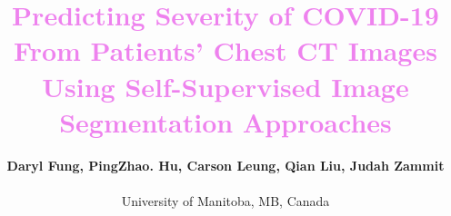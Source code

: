 \documentclass[journal]{IEEEtran}
\title{\textcolor{violet}{Predicting Severity of COVID-19 From Patients' Chest CT Images Using Self-Supervised Image Segmentation Approaches}}
\begin{document}

%
%

\author{\textbf{Daryl Fung, PingZhao. Hu, Carson Leung, Qian Liu, Judah Zammit}\\
\vspace*{0.1cm}

\small
University of Manitoba, MB, Canada\\

\normalsize
	
}

% 
%
%
\end{document}
